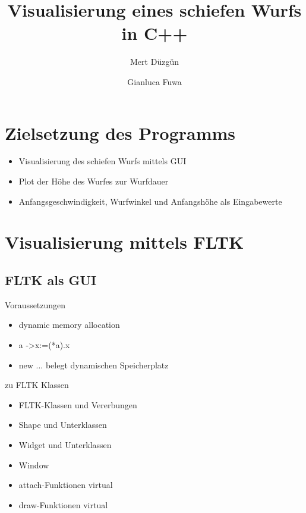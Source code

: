 \documentclass{beamer}
\title{Visualisierung eines schiefen Wurfs in C++}
\author{Mert Düzgün \and Gianluca Fuwa}
\begin{document}
\begin{frame}
  \titlepage
\end{frame}
\begin{frame}
\tableofcontents
\end{frame}

\section{Zielsetzung des Programms}
\begin{frame}
\begin{itemize}
\item Visualisierung des schiefen Wurfs mittels GUI
\item Plot der Höhe des Wurfes zur Wurfdauer
\item Anfangsgeschwindigkeit, Wurfwinkel und Anfangshöhe
als Eingabewerte 
\end{itemize}
\end{frame}

\section{Visualisierung mittels FLTK}
\subsection{FLTK als GUI}

\begin{frame}{Voraussetzungen}
  \begin{itemize}
  \item {dynamic memory allocation} \\
  \item { a -\textgreater x:=(*a).x}
  \item new ... belegt dynamischen Speicherplatz
  \end{itemize}
\end{frame}

\begin{frame}{zu FLTK Klassen}
\begin{itemize}
\item FLTK-Klassen und Vererbungen
\item Shape und Unterklassen
\item Widget und Unterklassen
\item Window 
\item attach-Funktionen virtual
\item draw-Funktionen virtual
\end{itemize}
\end{frame}
\end{document}
